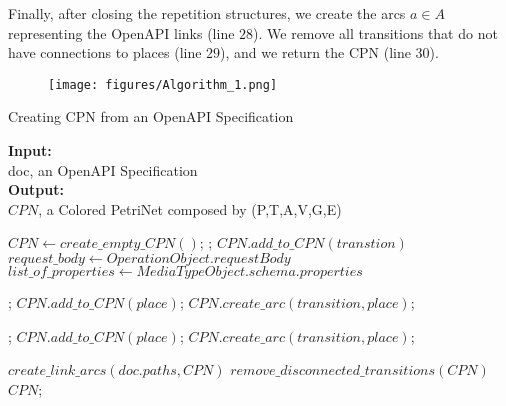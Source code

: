 Finally, after closing the repetition structures, we create the arcs \(a \in A\) representing the OpenAPI links (line $28$). We remove all transitions that do not have connections to places (line $29$), and we return the CPN (line $30$).


\begin{figure}[!htp]
    \center
    \texttt{[image: figures/Algorithm\_1.png]}
    \label{alg:createCPNfromOpenApi}
\end{figure}


 \begin{algorithm}[!htp]
 \caption{Creating CPN from an OpenAPI Specification}\label{alg:createCPNfromOpenApi}

 \hspace*{\algorithmicindent} \textbf{Input:} \\
 \hspace*{\algorithmicindent}doc, an OpenAPI Specification\\ 
 \hspace*{\algorithmicindent} \textbf{Output:} \\ 
 \hspace*{\algorithmicindent}\(CPN\), a Colored PetriNet composed by (P,T,A,V,G,E)
 \begin{algorithmic}[1]
 \State $CPN \gets create\_empty\_CPN()$;
     ; 
     \State $CPN.add\_to\_CPN(transtion)$
     \State $request\_body \gets Operation Object.requestBody$
     \State $list\_of\_properties \gets Media Type Object.schema.properties$
     
     ;
     \State $CPN.add\_to\_CPN(place)$;
     \State $CPN.create\_arc(transition, place)$;
     \EndIf
     \EndFor
     \EndFor
    
     ;
     \State $CPN.add\_to\_CPN(place)$;
     \State $CPN.create\_arc(transition, place)$;
     \EndIf
     \EndFor
    
     \EndFor
     \EndFor
 \EndFor
 \State $create\_link\_arcs(doc.paths, CPN)$
 \State $remove\_disconnected\_transitions(CPN)$
 \State \Return $CPN$;

 \end{algorithmic}
 \end{algorithm}


